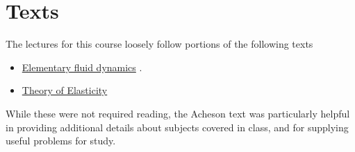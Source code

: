 \section{Texts}

The lectures for this course loosely follow portions of the following texts

\begin{itemize}
\item \href{http://www.amazon.com/Elementary-Dynamics-Applied-Mathematics-Computing/dp/0198596790/ref=sr_1_1?ie=UTF8&qid=1326302753&sr=8-1}{Elementary fluid dynamics} \citep{acheson1990elementary}.
\item \href{http://www.amazon.com/Theory-Elasticity-Third-Theoretical-Physics/dp/075062633X/ref=sr_1_6?s=books&ie=UTF8&qid=1326302957&sr=1-6}{Theory of Elasticity} \citep{landau1960theory}
\end{itemize}

While these were not required reading, the Acheson text was particularly helpful in providing additional details about subjects covered in class, and for supplying useful problems for study.
